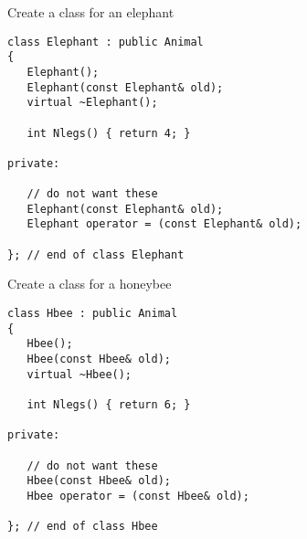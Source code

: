 Create a class for an elephant\\
\begin{boxedminipage}{\linewidth}
\begin{verbatim}
class Elephant : public Animal
{
   Elephant();
   Elephant(const Elephant& old);
   virtual ~Elephant();

   int Nlegs() { return 4; }

private:
   
   // do not want these
   Elephant(const Elephant& old);
   Elephant operator = (const Elephant& old);

}; // end of class Elephant
\end{verbatim}
\end{boxedminipage}
Create a class for a honeybee\\
\begin{boxedminipage}{\linewidth}
\begin{verbatim}
class Hbee : public Animal
{
   Hbee();
   Hbee(const Hbee& old);
   virtual ~Hbee();

   int Nlegs() { return 6; }

private:

   // do not want these
   Hbee(const Hbee& old);
   Hbee operator = (const Hbee& old);
   
}; // end of class Hbee
\end{verbatim}
\end{boxedminipage}

